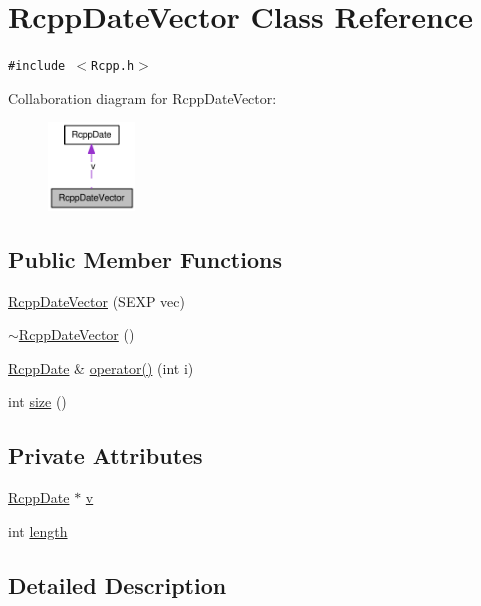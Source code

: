 \hypertarget{classRcppDateVector}{
\section{RcppDateVector Class Reference}
\label{classRcppDateVector}
}
{\tt \#include $<$Rcpp.h$>$}

Collaboration diagram for RcppDateVector:\nopagebreak
\begin{figure}[H]
\begin{center}
\leavevmode
\includegraphics[width=65pt]{classRcppDateVector__coll__graph}
\end{center}
\end{figure}
\subsection*{Public Member Functions}
\begin{CompactItemize}
\item 
\hyperlink{classRcppDateVector_65de4c0807f5c4b33429c8ebb5224831}{RcppDateVector} (SEXP vec)
\item 
\hyperlink{classRcppDateVector_ad0851f7555a09615ccb17bcb20fc7f1}{$\sim$RcppDateVector} ()
\item 
\hyperlink{classRcppDate}{RcppDate} \& \hyperlink{classRcppDateVector_7a6d9ceb233ed06f037013bdf4088a23}{operator()} (int i)
\item 
int \hyperlink{classRcppDateVector_03db4282da968eb4e0ae2a38375e0d37}{size} ()
\end{CompactItemize}
\subsection*{Private Attributes}
\begin{CompactItemize}
\item 
\hyperlink{classRcppDate}{RcppDate} $\ast$ \hyperlink{classRcppDateVector_faa34ebaf3d8bac309e81895c376f545}{v}
\item 
int \hyperlink{classRcppDateVector_a36764f68111a84b737b78600ff06433}{length}
\end{CompactItemize}


\subsection{Detailed Description}


